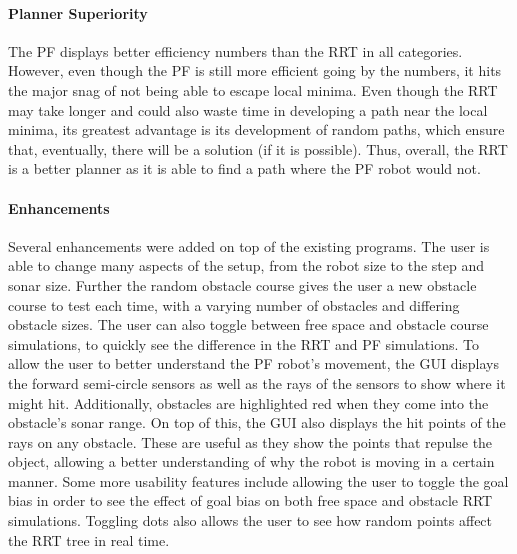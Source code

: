 \documentclass[12pt]{article}
\begin{document}
\paragraph*{Planner Superiority}
The PF displays better efficiency numbers than the RRT in all categories. However, even though the PF is still more efficient going by the numbers, it hits the major snag of not being able to escape local minima. Even though the RRT may take longer and could also waste time in developing a path near the local minima, its greatest advantage is its development of random paths, which ensure that, eventually, there will be a solution (if it is possible). Thus, overall, the RRT is a better planner as it is able to find a path where the PF robot would not. 

\paragraph*{Enhancements}
Several enhancements were added on top of the existing programs. The user is able to change many aspects of the setup, from the robot size to the step and sonar size. Further the random obstacle course gives the user a new obstacle course to test each time, with a varying number of obstacles and differing obstacle sizes. The user can also toggle between free space and obstacle course simulations, to quickly see the difference in the RRT and PF simulations.
To allow the user to better understand the PF robot's movement, the GUI displays the forward semi-circle sensors as well as the rays of the sensors to show where it might hit. Additionally, obstacles are highlighted red when they come into the obstacle's sonar range. On top of this, the GUI also displays the hit points of the rays on any obstacle. These are useful as they show the points that repulse the object, allowing a better understanding of why the robot is moving in a certain manner.
Some more usability features include allowing the user to toggle the goal bias in order to see the effect of goal bias on both free space and obstacle RRT simulations. Toggling dots also allows the user to see how random points affect the RRT tree in real time.
\end{document}
